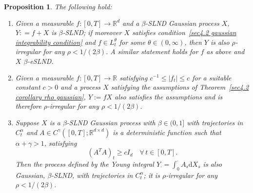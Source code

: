 \documentclass[10pt]{article}
\newcommand{\assign}{:=}
\newcommand{\mathd}{\mathrm{d}}
\newtheorem{proposition}[theorem]{Proposition}
\begin{document}
\begin{proposition}
  \label{sec4.2 prop deterministic perturbations}The following hold:
  \begin{enumerate}[label=\alph*.]
    \item Given a measurable $f : [0, T] \rightarrow \mathbb{R}^d$ and a
    $\beta$\mbox{-}SLND Gaussian process $X$, $Y : = f + X$ is
    $\beta$\mbox{-}SLND; if moreover $X$ satisfies condition~\eqref{sec4.2
    gaussian integrability condition} and $f \in L^{\theta}_t$ for some
    $\theta \in (0, \infty)$, then $Y$ is also $\rho$\mbox{-}irregular for any
    $\rho < 1 / (2 \beta)$. A similar statement holds for $f$ as above and $X$
    $\beta$-eSLND.
    
    \item Given a measurable $f : [0, T] \rightarrow \mathbb{R}$ satisfying
    $c^{- 1} \leqslant | f_t | \leqslant c $ for a suitable constant $c > 0$
    and a process $X$ satisfying the assumptions of Theorem~\ref{sec4.2
    corollary rho gaussian}, $Y \assign f X$ also satisfies the assumptions
    and is therefore $\rho$\mbox{-}irregular for any $\rho < 1 / (2 \beta)$.
    
    \item Suppose $X$ is a $\beta$\mbox{-}SLND Gaussian process with $\beta \in (0, 1]$
    with trajectories in $C^{\alpha}_t$ and $A \in C^{\gamma} ([0, T] ;
    \mathbb{R}^{d \times d})$ is a deterministic function such that $\alpha +
    \gamma > 1$, satisfying
    \[ (A^T A)_t \geqslant c I_d \quad \forall \, t \in [0, T] . \]
    Then the process defined by the Young integral $Y_{\cdot} = \int_0^{\cdot}
    A_s \mathd X_s$ is also Gaussian, $\beta$\mbox{-}SLND, with trajectories
    in $C^{\alpha}_t$; it is $\rho$\mbox{-}irregular for any $\rho < 1 / (2
    \beta)$.
  \end{enumerate}
\end{proposition}
\end{document}
